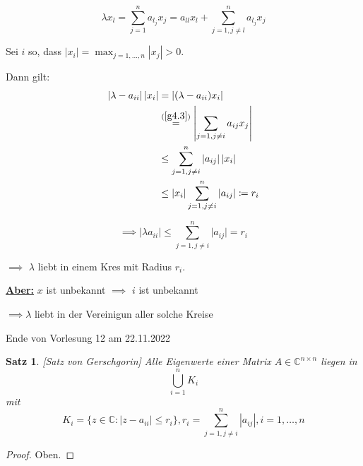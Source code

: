 \documentclass{book}
\newtheorem{theorem}[algorithm]{Satz}
\def\C{\mathbb{C}}
\begin{document}
            \begin{equation}\label{g4.3}
                \lambda x_l = \sum_{j=1}^n a_{l_j}x_j=a_{ll}x_l+\sum_{j=1,j \neq l}^n a_{l_j}x_j
            \end{equation}


            Sei $i$ so, dass $\vert x_i\vert =\max_{j=1,\dots, n}|x_j|>0$.

            Dann gilt: 
            \begin{align*}
                \left\vert \lambda -a_{ii} \right\vert \left\vert x_i \right\vert &= \left\vert (\lambda-a_{ii})x_i \right\vert\\
                &\stackrel{(\ref{g4.3})}{=}\left\vert \sum_{j=1,j\neq i} a_{ij}x_j \right\vert\\
                &\leq \sum_{j=1,j\neq i}^n \left\vert a_{ij} \right\vert \left\vert x_i \right\vert \\ 
                &\leq \vert x_i \vert \sum_{j=1,j\neq i}^n \left\vert a_{ij} \right\vert \coloneqq r_i
            \end{align*}

            \[\implies \left\vert \lambda a_{ii} \right\vert\leq \sum_{j=1,j\neq i}^n \vert a_{ij}\vert= r_i\] %

            $\implies$ $\lambda$ liebt in einem Kres mit Radius $r_i$.

            \underline{\textbf{Aber:}} $x$ ist unbekannt $\implies$ $i$ ist unbekannt 

            $\implies \lambda$ liebt in der Vereinigun aller solche Kreise

            \noindent
            \xrfill[0.7ex]{1pt}Ende von Vorlesung 12 am 22.11.2022\xrfill[0.7ex]{1pt}
        
            \begin{theorem}\label{s4.7}[Satz von Gerschgorin]
                Alle Eigenwerte einer Matrix $A\in\C^{n\times n}$ liegen in 
                \[\bigcup_{i=1}^n K_i\] mit 
                \[K_i=\{z\in\C: \left\vert z-a_{ii} \right\vert \leq r_i\},r_i=\sum_{j=1,j\neq i}^n \left\vert a_{ij} \right\vert, i=1,\dots,n\]
            \end{theorem}

            \begin{proof}
                Oben.
            \end{proof}

\end{document}
